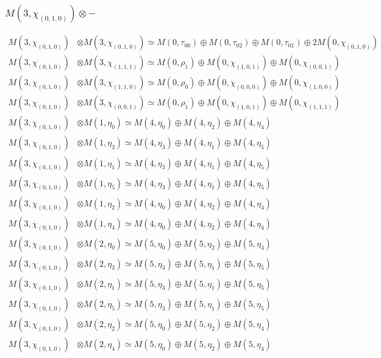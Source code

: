 \subsubsection{$ M(3,\chi_{(0,1,0)})\otimes -$}
\begin{align*}
M(3,\chi_{(0,1,0)}) &\otimes M(3,\chi_{(0,1,0)}) \simeq M(0,\tau_{00}) \oplus M(0,\tau_{02}) \oplus M(0,\tau_{01}) \oplus 2 M(0,\chi_{(0,1,0)})\\
M(3,\chi_{(0,1,0)}) &\otimes M(3,\chi_{(1,1,1)}) \simeq M(0,\rho_{1}) \oplus M(0,\chi_{(1,0,1)}) \oplus M(0,\chi_{(0,0,1)})\\
M(3,\chi_{(0,1,0)}) &\otimes M(3,\chi_{(1,1,0)}) \simeq M(0,\rho_{0}) \oplus M(0,\chi_{(0,0,0)}) \oplus M(0,\chi_{(1,0,0)})\\
M(3,\chi_{(0,1,0)}) &\otimes M(3,\chi_{(0,0,1)}) \simeq M(0,\rho_{1}) \oplus M(0,\chi_{(1,0,1)}) \oplus M(0,\chi_{(1,1,1)})\\
M(3,\chi_{(0,1,0)}) &\otimes M(1,\eta_{0}) \simeq M(4,\eta_{0}) \oplus M(4,\eta_{2}) \oplus M(4,\eta_{4})\\
M(3,\chi_{(0,1,0)}) &\otimes M(1,\eta_{3}) \simeq M(4,\eta_{3}) \oplus M(4,\eta_{1}) \oplus M(4,\eta_{5})\\
M(3,\chi_{(0,1,0)}) &\otimes M(1,\eta_{1}) \simeq M(4,\eta_{3}) \oplus M(4,\eta_{1}) \oplus M(4,\eta_{5})\\
M(3,\chi_{(0,1,0)}) &\otimes M(1,\eta_{5}) \simeq M(4,\eta_{3}) \oplus M(4,\eta_{1}) \oplus M(4,\eta_{5})\\
M(3,\chi_{(0,1,0)}) &\otimes M(1,\eta_{2}) \simeq M(4,\eta_{0}) \oplus M(4,\eta_{2}) \oplus M(4,\eta_{4})\\
M(3,\chi_{(0,1,0)}) &\otimes M(1,\eta_{4}) \simeq M(4,\eta_{0}) \oplus M(4,\eta_{2}) \oplus M(4,\eta_{4})\\
M(3,\chi_{(0,1,0)}) &\otimes M(2,\eta_{0}) \simeq M(5,\eta_{0}) \oplus M(5,\eta_{2}) \oplus M(5,\eta_{4})\\
M(3,\chi_{(0,1,0)}) &\otimes M(2,\eta_{3}) \simeq M(5,\eta_{3}) \oplus M(5,\eta_{1}) \oplus M(5,\eta_{5})\\
M(3,\chi_{(0,1,0)}) &\otimes M(2,\eta_{1}) \simeq M(5,\eta_{3}) \oplus M(5,\eta_{1}) \oplus M(5,\eta_{5})\\
M(3,\chi_{(0,1,0)}) &\otimes M(2,\eta_{5}) \simeq M(5,\eta_{3}) \oplus M(5,\eta_{1}) \oplus M(5,\eta_{5})\\
M(3,\chi_{(0,1,0)}) &\otimes M(2,\eta_{2}) \simeq M(5,\eta_{0}) \oplus M(5,\eta_{2}) \oplus M(5,\eta_{4})\\
M(3,\chi_{(0,1,0)}) &\otimes M(2,\eta_{4}) \simeq M(5,\eta_{0}) \oplus M(5,\eta_{2}) \oplus M(5,\eta_{4})\\

\end{align*}

